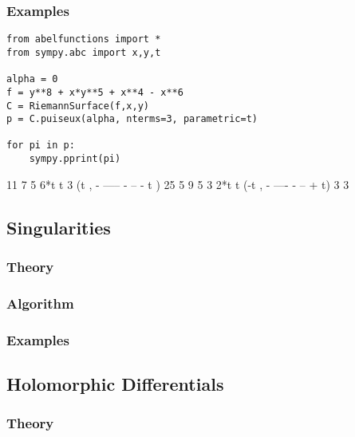 \subsubsection*{Examples}

\begin{lstlisting}
from abelfunctions import *
from sympy.abc import x,y,t

alpha = 0
f = y**8 + x*y**5 + x**4 - x**6
C = RiemannSurface(f,x,y)
p = C.puiseux(alpha, nterms=3, parametric=t)

for pi in p:
    sympy.pprint(pi)
\end{lstlisting}
\begin{pyoutput}
          11    7      
  5    6*t     t     3 
(t , - ----- - -- - t )
         25    5       
           9    5     
   3    2*t    t      
(-t , - ---- - -- + t)
         3     3      
\end{pyoutput}

\subsection{Singularities}

%
\subsubsection*{Theory}
%
%
\subsubsection*{Algorithm}
%
%
\subsubsection*{Examples}
%

\subsection{Holomorphic Differentials}

%
\subsubsection*{Theory}
%



